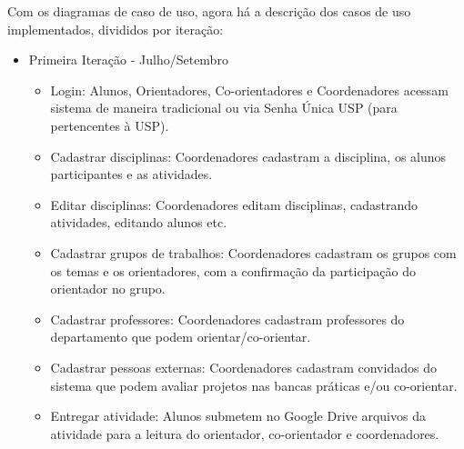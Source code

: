 Com os diagramas de caso de uso, agora há a descrição dos casos de uso implementados, divididos por iteração:

\begin{itemize}
    \item Primeira Iteração - Julho/Setembro
    \begin{itemize}
        \item Login: Alunos, Orientadores, Co-orientadores e Coordenadores acessam sistema de maneira tradicional ou via Senha Única USP (para pertencentes à USP).
        \item Cadastrar disciplinas: Coordenadores cadastram a disciplina, os alunos participantes e as atividades.
        \item Editar disciplinas: Coordenadores editam disciplinas, cadastrando atividades, editando alunos etc.
        \item Cadastrar grupos de trabalhos: Coordenadores cadastram os grupos com os temas e os orientadores, com a confirmação da participação do orientador no grupo.
        \item Cadastrar professores: Coordenadores cadastram professores do departamento que podem orientar/co-orientar.
        \item Cadastrar pessoas externas: Coordenadores cadastram convidados do sistema que podem avaliar projetos nas bancas práticas e/ou co-orientar.
        \item Entregar atividade: Alunos submetem no Google Drive arquivos da atividade para a leitura do orientador, co-orientador e coordenadores.
    \end{itemize}
\end{itemize}


